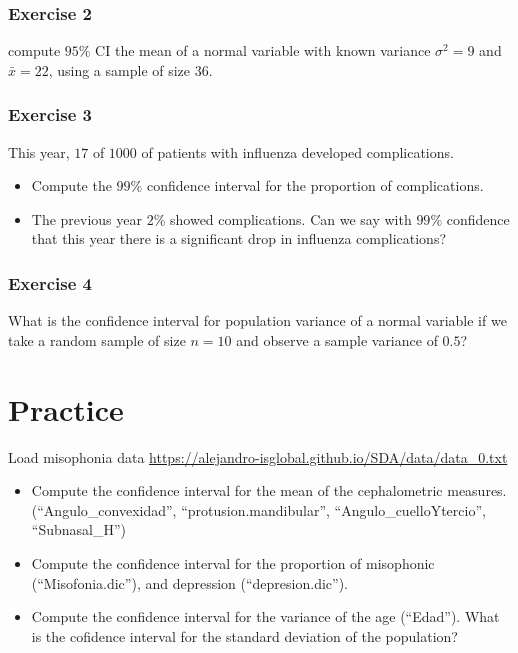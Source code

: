 \documentclass[
]{book}
\begin{document}
\hypertarget{exercise-2-11}{%
\subsubsection{Exercise 2}\label{exercise-2-11}}

compute \(95\%\) CI the mean of a normal variable with known variance \(\sigma^2=9\) and \(\bar{x}=22\), using a sample of size \(36\).

\hypertarget{exercise-3-8}{%
\subsubsection{Exercise 3}\label{exercise-3-8}}

This year, \(17\) of \(1000\) of patients with influenza developed complications.

\begin{itemize}
\item
  Compute the \(99\%\) confidence interval for the proportion of complications.
\item
  The previous year \(2\%\) showed complications. Can we say with \(99\%\) confidence that this year there is a significant drop in influenza complications?
\end{itemize}

\hypertarget{exercise-4-4}{%
\subsubsection{Exercise 4}\label{exercise-4-4}}

What is the confidence interval for population variance of a normal variable if we take a random sample of size \(n=10\) and observe a sample variance of \(0.5\)?

\hypertarget{practice}{%
\section{Practice}\label{practice}}

Load misophonia data \url{https://alejandro-isglobal.github.io/SDA/data/data_0.txt}

\begin{itemize}
\item
  Compute the confidence interval for the mean of the cephalometric measures. (``Angulo\_convexidad'', ``protusion.mandibular'', ``Angulo\_cuelloYtercio'', ``Subnasal\_H'')
\item
  Compute the confidence interval for the proportion of misophonic (``Misofonia.dic''), and depression (``depresion.dic'').
\item
  Compute the confidence interval for the variance of the age (``Edad''). What is the cofidence interval for the standard deviation of the population?
\end{itemize}
\end{document}
